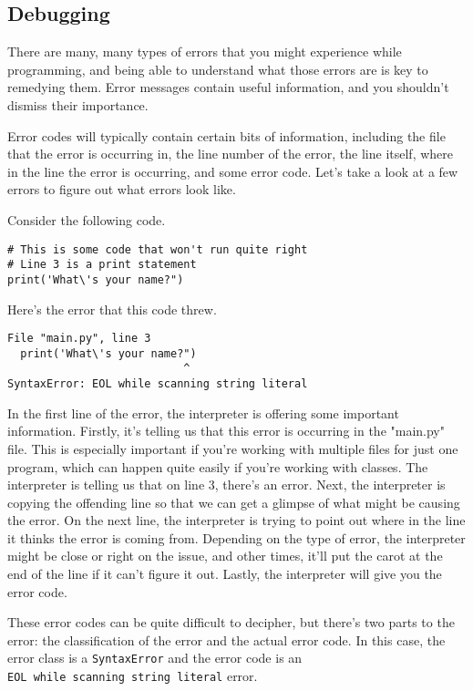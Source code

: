 \subsection{Debugging}
There are many, many types of errors that you might experience while programming, and being able to understand what those errors are is key to remedying them. Error messages contain useful information, and you shouldn't dismiss their importance.\par
Error codes will typically contain certain bits of information, including the file that the error is occurring in, the line number of the error, the line itself, where in the line the error is occurring, and some error code. Let's take a look at a few errors to figure out what errors look like.\par
Consider the following code.
\begin{lstlisting}[style=pippython]
# This is some code that won't run quite right
# Line 3 is a print statement
print('What\'s your name?")
\end{lstlisting}
Here's the error that this code threw.\par
\begin{lstlisting}[style=none]
File "main.py", line 3
  print('What\'s your name?")
                           ^
SyntaxError: EOL while scanning string literal
\end{lstlisting}
In the first line of the error, the interpreter is offering some important information. Firstly, it's telling us that this error is occurring in the "main.py" file. This is especially important if you're working with multiple files for just one program, which can happen quite easily if you're working with classes. The interpreter is telling us that on line 3, there's an error. Next, the interpreter is copying the offending line so that we can get a glimpse of what might be causing the error. On the next line, the interpreter is trying to point out where in the line it thinks the error is coming from. Depending on the type of error, the interpreter might be close or right on the issue, and other times, it'll put the carot at the end of the line if it can't figure it out. Lastly, the interpreter will give you the error code.\par
These error codes can be quite difficult to decipher, but there's two parts to the error: the classification of the error and the actual error code. In this case, the error class is a \verb|SyntaxError| and the error code is an\\ \verb|EOL while scanning string literal| error.\par
